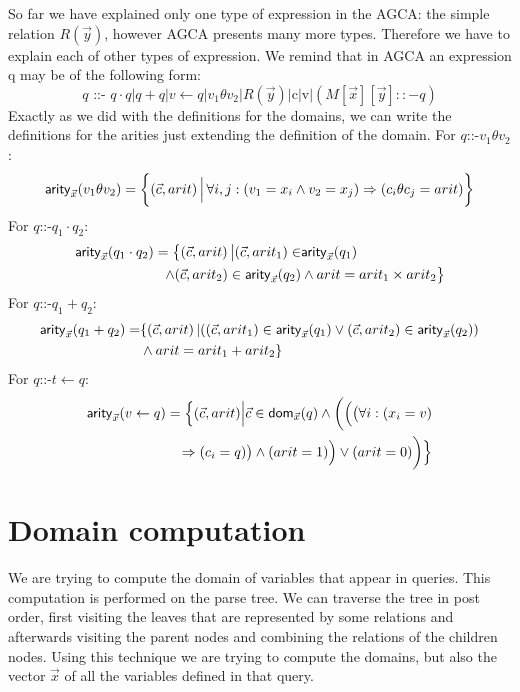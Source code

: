 \documentclass[12pt]{article}
\begin{document}
So far we have explained only one type of expression in the AGCA: the simple relation $R(\vec y)$, however AGCA presents many more types. Therefore we have to explain each of other types of expression. We remind that in AGCA an expression q may be of the following form:
\begin{equation}
q\text{ ::- }q\cdot q | q + q|v \gets q |v_{1}\theta v_{2}|R(\vec{y})|\text{c}|\text{v}|(M[\vec{x}][\vec{y}]::-q)
\end{equation}
Exactly as we did with the definitions for the domains, we can write the definitions for the arities just extending the definition of the domain. For $q\text{::-}v_{1}\theta v_{2}$:
\begin{equation}
\text{\textsf{arity}{}}_{\vec{x}}(v_{1}\theta v_{2})=\bigg\{(\vec{c},arit)\,\Big|\,\forall i,j:(v_{1}=x_{i}\land v_{2}=x_{j})\Rightarrow (c_{i}\theta c_{j}=arit)\bigg\}
\end{equation}
For $q\text{::-}q_{1}\cdot q_{2}$:
\begin{align} 
\text{\textsf{arity}}_{\vec{x}}(q_{1}\cdot q_{2})=\big\{(\vec{c},arit)\,\big|(\vec{c},arit_{1})\in&\text{\textsf{arity}}_{\vec{x}}(q_{1})\nonumber\\\land (\vec{c},arit_{2})\in\text{\textsf{arity}{}}_{\vec{x}}(q_{2})& \land arit= arit_{1}\times arit_{2}\big\}
\end{align}
For $q\text{::-}q_{1}+q_{2}$:
\begin{align}
\text{\textsf{arity}{}}_{\vec{x}}(q_{1}+ q_{2})=&\{(\vec{c},arit)\,|((\vec{c},arit_{1})\in\text{\textsf{arity}{}}_{\vec{x}}(q_{1})\lor(\vec{c},arit_{2})\in\text{\textsf{arity}{}}_{\vec{x}}(q_{2})) \nonumber\\&\land arit=arit_{1}+arit_{2}\}
\end{align}
For $q\text{::-}t\gets q$:
\begin{align}
\text{\textsf{arity}{}}_{\vec{x}}(v\gets q)=\Big\{(\vec{c},arit)\Big|\vec{c}\in\text{\textsf{dom}{}}_{\vec{x}}(q)\land \bigg(\Big(\big(\forall i: (x_{i}=v) & \nonumber\\\Rightarrow(c_{i}=q)\big)\land (arit=1)\Big)\lor (arit=0)\bigg)\Big\}
\end{align}

\section{Domain computation}

We are trying to compute the domain of variables that appear in queries. This computation is performed on the parse tree. We can traverse the tree in post order, first visiting the leaves that are represented by some relations and afterwards visiting the parent nodes and combining the relations of the children nodes. Using this technique we are trying to compute the domains, but also the vector $\vec x$ of all the variables defined in that query.
\end{document}
